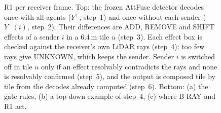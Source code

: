 \begin{figure}[!t]
\caption{R1 per receiver frame. Top: the frozen AttFuse detector decodes once with all agents ($Y^{+}$,
step~1) and once without each sender ($Y^{-}(i)$, step~2). Their differences are ADD, REMOVE and SHIFT effects
of a sender $i$ in a 6.4\,m tile $u$ (step~3). Each effect box is checked against the receiver's own LiDAR rays
(step~4); too few rays give UNKNOWN, which keeps the sender. Sender $i$ is switched off in tile $u$ only if an
effect resolvably contradicts the rays and none is resolvably confirmed (step~5), and the output is composed
tile by tile from the decodes already computed (step~6). Bottom: (a) the gate rules, (b) a top-down example
of step~4, (c) where B-RAY and R1 act.}
\label{fig:r1method}
\end{figure}
